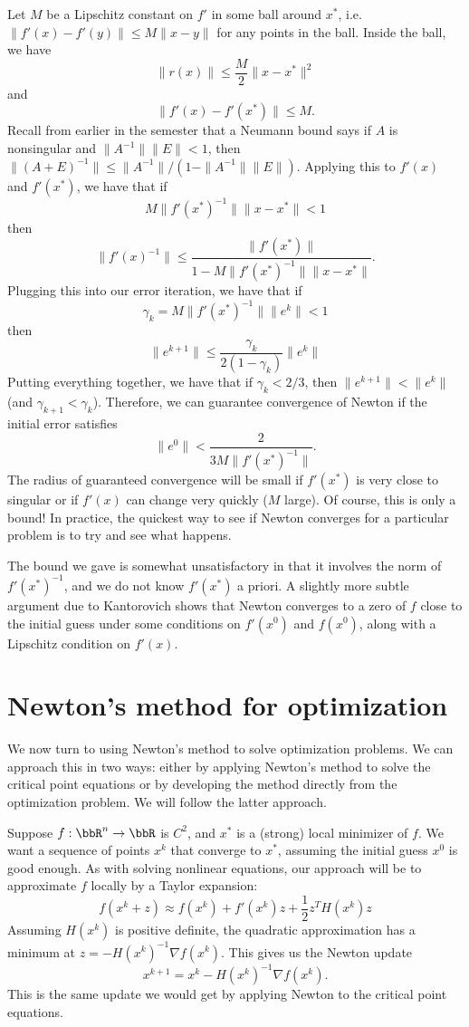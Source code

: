 \documentclass[12pt, leqno]{article} %
\begin{document}
Let $M$ be a Lipschitz constant on $f'$ in some ball around $x^*$,
i.e.  $\|f'(x)-f'(y)\| \leq M \|x-y\|$ for any points in the ball.
Inside the ball, we have
\[
  \|r(x)\| \leq \frac{M}{2} \|x-x^*\|^2
\]
and
\[
  \|f'(x)-f'(x^*)\| \leq M.
\]
Recall from earlier in the semester that a Neumann bound says
if $A$ is nonsingular and $\|A^{-1}\| \|E\| < 1$, then
$\|(A+E)^{-1}\| \leq \|A^{-1}\| / (1-\|A^{-1}\| \|E\|)$.
Applying this to $f'(x)$ and $f'(x^*)$, we have that if
\[
  M \|f'(x^*)^{-1}\| \|x-x^*\| < 1
\]
then
\[
  \|f'(x)^{-1}\| \leq \frac{\|f'(x^*)\|}{1-M \|f'(x^*)^{-1}\|\|x-x^*\|}.
\]
Plugging this into our error iteration, we have that if
\[
  \gamma_k = M \|f'(x^*)^{-1}\| \|e^k\| < 1
\]
then
\[
  \|e^{k+1}\| \leq \frac{\gamma_k}{2 (1-\gamma_k)} \|e^k\|
\]
Putting everything together, we have that if $\gamma_k < 2/3$, then
$\|e^{k+1}\| < \|e^k\|$ (and $\gamma_{k+1} < \gamma_k$).  Therefore,
we can guarantee convergence of Newton if the initial error satisfies
\[
  \|e^0\| < \frac{2}{3 M \|f'(x^*)^{-1}\|}.
\]
The radius of guaranteed convergence will be small if $f'(x^*)$ is
very close to singular or if $f'(x)$ can change very quickly ($M$
large).  Of course, this is only a bound!  In practice, the quickest
way to see if Newton converges for a particular problem is to try
and see what happens.

The bound we gave is somewhat unsatisfactory in that it involves
the norm of $f'(x^*)^{-1}$, and we do not know $f'(x^*)$ a priori.
A slightly more subtle argument due to Kantorovich shows that Newton
converges to a zero of $f$ close to the initial guess under some
conditions on $f'(x^0)$ and $f(x^0)$, along with a Lipschitz condition
on $f'(x)$.

\section*{Newton's method for optimization}

We now turn to using Newton's method to solve optimization problems.
We can approach this in two ways: either by applying Newton's method
to solve the critical point equations or by developing the method
directly from the optimization problem.  We will follow the latter
approach.

Suppose $f : \bbR^n \rightarrow \bbR$ is $C^2$, and $x^*$ is a
(strong) local minimizer of $f$.  We want a sequence of points $x^k$
that converge to $x^*$, assuming the initial guess $x^0$ is good
enough.  As with solving nonlinear equations, our approach will be
to approximate $f$ locally by a Taylor expansion:
\[
  f(x^k + z) \approx f(x^k) + f'(x^k) z + \frac{1}{2} z^T H(x^k) z
\]
Assuming $H(x^k)$ is positive definite, the quadratic approximation
has a minimum at $z = -H(x^k)^{-1} \nabla f(x^k)$.  This gives us the
Newton update
\[
  x^{k+1} = x^k - H(x^k)^{-1} \nabla f(x^k).
\]
This is the same update we would get by applying Newton to the
critical point equations.
\end{document}
